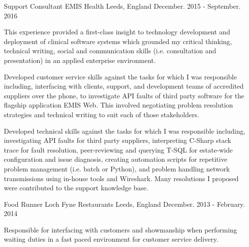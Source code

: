

\begin{cventries}

  \cventry
    {Support Consultant} %
    {EMIS Health} %
    {Leeds, England} %
    {December. 2015 - September. 2016} %
    {
      \begin{cvitems} %
	\item {This experience provided a first-class insight to technology development and deployment of clinical software systems which grounded my critical thinking, technical writing, social and communication skills  (i.e. consultation and presentation) in an applied enterprise environment.}
	\item {Developed customer service skills against the tasks for which I was responsible including, interfacing with clients, support, and development teams of accredited suppliers over the phone, to investigate API faults of third party software for the flagship application EMIS Web. This involved negotiating problem resolution strategies and technical writing to suit each of those stakeholders.}
	\item{Developed technical skills against the tasks for which I was responsible including, investigating API faults for third party suppliers, interpreting C-Sharp stack trace for fault resolution, peer-reviewing and querying T-SQL for estate-wide configuration and issue diagnosis, creating automation scripts for repetitive problem management (i.e. batch or Python), and problem handling network transmissions using in-house tools and Wireshark. Many resolutions I proposed were contributed to the support knowledge base.}
      \end{cvitems}
    }

  \cventry
    {Food Runner} %
    {Loch Fyne Restaurants} %
    {Leeds, England} %
    {December. 2013 - February. 2014} %
    {
      \begin{cvitems} %
        \item {Responsible for interfacing with customers and showmanship when performing waiting duties in a fast paced environment for customer service delivery.}
      \end{cvitems}
    }


\end{cventries}
